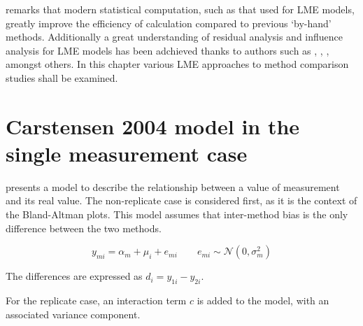 \documentclass[12pt, a4paper]{report}
\theoremstyle{plain}
\theoremstyle{definition}
\theoremstyle{remark}
\begin{document}
		\citet{BXC2008} remarks that modern statistical computation, such as that used for LME models, greatly improve the efficiency of
		calculation compared to previous `by-hand' methods. Additionally a great understanding of residual analysis and influence analysis for LME models has been adchieved thanks to authors such as \citet{schab}, \citet{CPJ}, \citet{cook86} \citet{west}, amongst others. In this chapter various LME approaches to method comparison studies shall
		be examined.

\newpage

	

	
	
	
	
	
\section{Carstensen 2004 model in the single measurement case}
	\citet{BXC2004} presents a model to describe the relationship between a value of measurement and its real value.
	The non-replicate case is considered first, as it is the context of the Bland-Altman plots.
	This model assumes that inter-method bias is the only difference between the two methods.
	
	
	\begin{equation}
	y_{mi}  = \alpha_{m} + \mu_{i} + e_{mi} \qquad  e_{mi} \sim \mathcal{N}(0,\sigma^{2}_{m})
	\end{equation}
	
	The differences are expressed as $d_{i} = y_{1i} - y_{2i}$.
	
	For the replicate case, an interaction term $c$ is added to the model, with an associated variance component.




\end{document}
